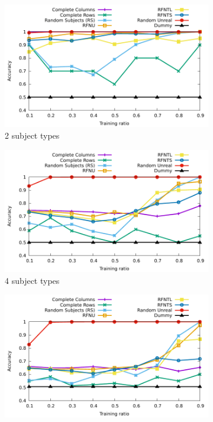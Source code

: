 \documentclass[10pt, conference, compsocconf]{IEEEtran}
\begin{document}
\begin{figure}
\begin{subfigure}[b]{\columnwidth}
        \includegraphics[width=0.8\columnwidth]{data/results/means_of_results/ALS/Synthetic/synthetic_subject_types/ALS-2-types.pdf}
        \caption{2 subject types}
\end{subfigure}
\begin{subfigure}[b]{\columnwidth}
        \includegraphics[width=0.8\columnwidth]{data/results/means_of_results/ALS/Synthetic/synthetic_subject_types/ALS-4-types.pdf}
        \caption{4 subject types}
\end{subfigure}
\begin{subfigure}[b]{\columnwidth}
        \includegraphics[width=0.8\columnwidth]{data/results/means_of_results/ALS/Synthetic/synthetic_subject_types/ALS-8-types.pdf}

\end{subfigure}
\end{figure}
\end{document}
